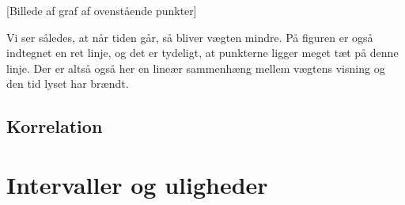\documentclass[12pt,oneside,a4paper]{article}
\begin{document}
[Billede af graf af ovenstående punkter]

Vi ser således, at når tiden går, så bliver vægten mindre.
På figuren er også indtegnet en ret linje, og det er tydeligt, at punkterne
ligger meget tæt på denne linje.  Der er altså også her en lineær sammenhæng
mellem vægtens visning og den tid lyset har brændt.

\subsection{Korrelation}
\section{Intervaller og uligheder}
\end{document}
